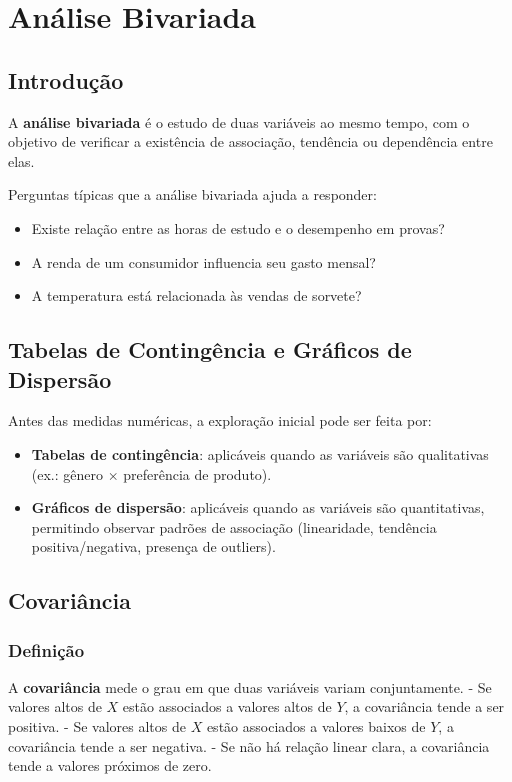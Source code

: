 \chapter{Análise Bivariada}

\section{Introdução}
A \textbf{análise bivariada} é o estudo de duas variáveis ao mesmo tempo, com o objetivo de verificar a existência de associação, tendência ou dependência entre elas.  

Perguntas típicas que a análise bivariada ajuda a responder:
\begin{itemize}[leftmargin=*]
  \item Existe relação entre as horas de estudo e o desempenho em provas?
  \item A renda de um consumidor influencia seu gasto mensal?
  \item A temperatura está relacionada às vendas de sorvete?
\end{itemize}

\section{Tabelas de Contingência e Gráficos de Dispersão}
Antes das medidas numéricas, a exploração inicial pode ser feita por:
\begin{itemize}[leftmargin=*]
  \item \textbf{Tabelas de contingência}: aplicáveis quando as variáveis são qualitativas (ex.: gênero $\times$ preferência de produto).
  \item \textbf{Gráficos de dispersão}: aplicáveis quando as variáveis são quantitativas, permitindo observar padrões de associação (linearidade, tendência positiva/negativa, presença de outliers).
\end{itemize}

\section{Covariância}
\subsection*{Definição}
A \textbf{covariância} mede o grau em que duas variáveis variam conjuntamente.  
- Se valores altos de $X$ estão associados a valores altos de $Y$, a covariância tende a ser positiva.  
- Se valores altos de $X$ estão associados a valores baixos de $Y$, a covariância tende a ser negativa.  
- Se não há relação linear clara, a covariância tende a valores próximos de zero.

